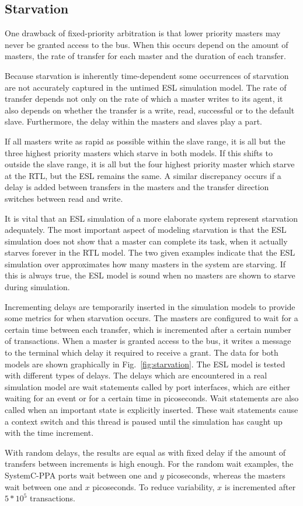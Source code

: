 \subsection{Starvation}
\label{sub:starvation}
One drawback of fixed-priority arbitration is that lower priority masters may never be granted access to the bus. When this occurs depend on the amount of masters, the rate of transfer for each master and the duration of each transfer. \par
Because starvation is inherently time-dependent some occurrences of starvation are not accurately captured in the untimed ESL simulation model. The rate of transfer depends not only on the rate of which a master writes to its agent, it also depends on whether the transfer is a write, read, successful or to the default slave. Furthermore, the delay within the masters and slaves play a part. \par
If all masters write as rapid as possible within the slave range, it is all but the three highest priority masters which starve in both models. If this shifts to outside the slave range, it is all but the four highest priority master which starve at the RTL, but the ESL remains the same. A similar discrepancy occurs if a delay is added between transfers in the masters and the transfer direction switches between read and write. \par
It is vital that an ESL simulation of a more elaborate system represent starvation adequately. The most important aspect of modeling starvation is that the ESL simulation does not show that a master can complete its task, when it actually starves forever in the RTL model. The two given examples indicate that the ESL simulation over approximates how many masters in the system are starving. If this is always true, the ESL model is sound when no masters are shown to starve during simulation. \par
Incrementing delays are temporarily inserted in the simulation models to provide some metrics for when starvation occurs. The masters are configured to wait for a certain time between each transfer, which is incremented after a certain number of transactions. When a master is granted access to the bus, it writes a message to the terminal which delay it required to receive a grant. The data for both models are shown graphically in Fig.~\ref{fig:starvation}. The ESL model is tested with different types of delays. The delays which are encountered in a real simulation model are wait statements called by port interfaces, which are either waiting for an event or for a certain time in picoseconds. Wait statements are also called when an important state is explicitly inserted. These wait statements cause a context switch and this thread is paused until the simulation has caught up with the time increment. \par
With random delays, the results are equal as with fixed delay if the amount of transfers between increments is high enough. For the random wait examples, the SystemC-PPA ports wait between one and $y$ picoseconds, whereas the masters wait between one and $x$ picoseconds. To reduce variability, $x$ is incremented after $5*10^5$ transactions.      

